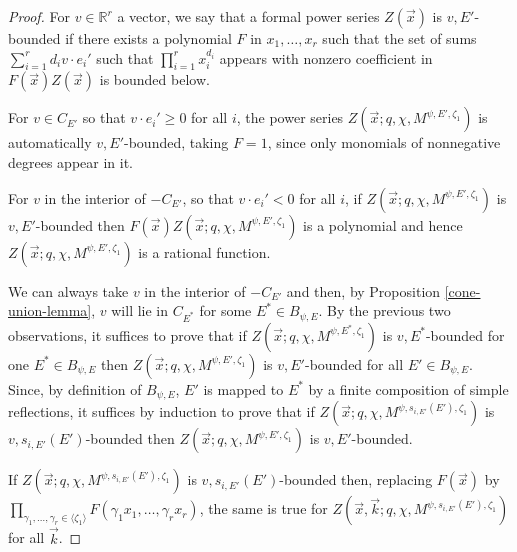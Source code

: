 \documentclass[11pt,letterpaper]{article}
\theoremstyle{definition}
\theoremstyle{remark}
\numberwithin{equation}{section}
\theoremstyle{dotless}
\newcommand{\hchi}{\psi} %
\newcommand{\gene}{\zeta_1} %
\begin{document}
\begin{proof} For $v \in \mathbb R^r$ a vector, we say that a formal power series $Z(\vec{x})$ is $v,E'$-bounded if there exists a polynomial $F$ in $x_1,\dots, x_r$ such that the set of sums $\sum_{i=1}^r d_i v \cdot e_i'$ such that  $\prod_{i=1}^r x_i^{d_i}$ appears with nonzero coefficient in $F(\vec{x})Z ( \vec{x})$ is bounded below.

For $v \in C_{E'}$ so that $v \cdot e_i' \geq 0$ for all $i$, the power series $Z ( \vec{x}; q, \chi, M^{\hchi, E',\gene})$ is automatically $v,E'$-bounded, taking $F=1$, since only monomials of nonnegative degrees appear in it.

For $v$ in the interior of $- C_{E'}$, so that $v \cdot e_i'<0$ for all $i$, if $Z ( \vec{x}; q, \chi, M^{\hchi, E',\gene})$ is $v,E'$-bounded then $F(\vec{x})Z ( \vec{x}; q, \chi, M^{\hchi, E',\gene})$ is a polynomial and hence $Z ( \vec{x}; q, \chi, M^{\hchi, E',\gene})$ is a rational function.

We can always take $v$ in the interior of $-C_{E'}$ and then, by Proposition \ref{cone-union-lemma}, $v$ will lie in $C_{E^*}$ for some $E^*\in B_{\hchi,E}$. By the previous two observations, it suffices to prove that if $Z ( \vec{x}; q, \chi, M^{\hchi, E^*,\gene})$ is $v,E^*$-bounded for one $E^* \in B_{\hchi,E}$ then $Z ( \vec{x}; q, \chi, M^{\hchi, E',\gene})$ is $v,E'$-bounded for all $E' \in B_{\hchi,E}$. Since, by definition of $B_{\hchi,E}$, $E'$ is mapped to $E^*$ by a finite composition of simple reflections, it suffices by induction to prove that if  $Z ( \vec{x}; q, \chi, M^{\hchi, s_{i,E'}(E'),\gene})$ is $v,s_{i,E'}(E')$-bounded then $Z ( \vec{x}; q, \chi, M^{\hchi, E',\gene})$ is $v,E'$-bounded.

If  $Z ( \vec{x}; q, \chi, M^{\hchi, s_{i,E'}(E'),\gene})$ is  $v,s_{i,E'}(E')$-bounded then, replacing $F(\vec x)$ by $ \prod_{ \gamma_1,\ldots,\gamma_r \in \langle \gene\rangle} F(\gamma_1x_1,\ldots, \gamma_r x_r)$, the same is true for  $Z ( \vec{x}, \vec{k}; q, \chi, M^{\hchi, s_{i,E'}(E'),\gene})$ for all $\vec{k}$.


\end{proof}
\end{document}
